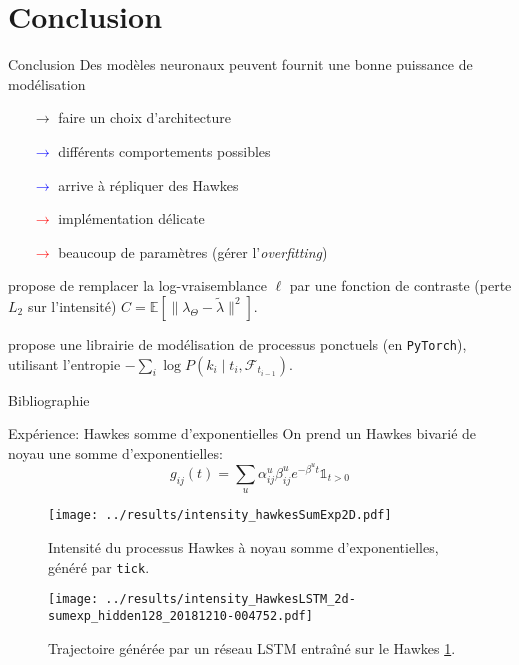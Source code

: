 \documentclass{beamer}
\newcommand{\EE}{\mathbb{E}}
\begin{document}


\section{Conclusion}

\begin{frame}{Conclusion}
Des modèles neuronaux peuvent fournit une bonne puissance de modélisation
\begin{itemize}
	\item[$\rightarrow$] faire un choix d'architecture 
	\item[\textcolor{blue}{$\rightarrow$}] différents comportements possibles
	\item[\textcolor{blue}{$\rightarrow$}] arrive à répliquer des Hawkes\pause
	\item[\textcolor{red}{$\rightarrow$}] implémentation délicate
	\item[\textcolor{red}{$\rightarrow$}] beaucoup de paramètres (gérer l'\textit{overfitting})
\end{itemize}
\end{frame}

\begin{frame}{}
\cite[42]{2015arXiv150204592B} propose de remplacer la log-vraisemblance $\ell$ par une fonction de contraste (perte $L_2$ sur l'intensité) $C = \EE[\|\lambda_\Theta - \tilde{\lambda} \|^2]$.

\citeauthor{xu2018poppy} propose une librairie de modélisation de processus ponctuels (en \texttt{PyTorch}), utilisant l'entropie $-\sum_i \log P(k_i\mid t_i,\mathcal{F}_{t_{i-1}})$. \cite{xu2018poppy,xuPatientFlow2017}

\end{frame}

\begin{frame}[t,allowframebreaks]{Bibliographie}
	\printbibliography
\end{frame}

\appendix

\begin{frame}{Expérience: Hawkes somme d'exponentielles}
On prend un Hawkes bivarié de noyau une somme d'exponentielles:
\[
	g_{ij}(t) = \sum_u \alpha_{ij}^u\beta_{ij}^u e^{-\beta^ut}\mathds{1}_{t > 0}
\]
\end{frame}

\begin{frame}
\begin{figure}
	\texttt{[image: ../results/intensity\_hawkesSumExp2D.pdf]}
	\caption{Intensité du processus Hawkes à noyau somme d'exponentielles, généré par \texttt{tick}.}\label{fig:hawkesSumExpIntensityPlot}
\end{figure}
\end{frame}

\begin{frame}
\begin{figure}
	\texttt{[image: ../results/intensity\_HawkesLSTM\_2d-sumexp\_hidden128\_20181210-004752.pdf]}
	\caption{Trajectoire générée par un réseau LSTM entraîné sur le Hawkes \cref{fig:hawkesSumExpIntensityPlot}.}
\end{figure}
\end{frame}
\end{document}
